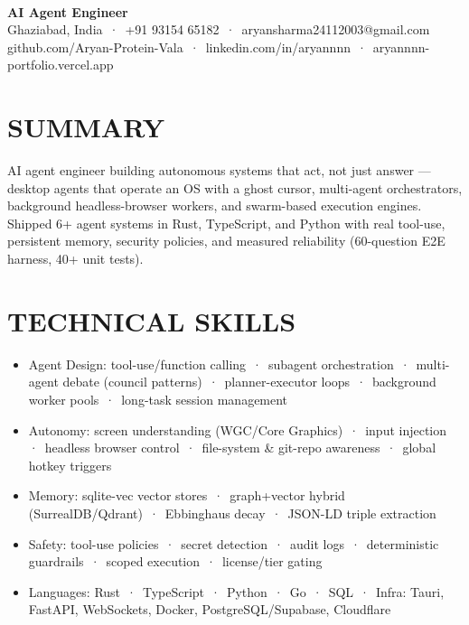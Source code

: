\documentclass[9pt]{article}
\begin{document}
\\[3pt]
{\large\bfseries AI Agent Engineer}\\[3pt]
{\small\color{greyc} Ghaziabad, India \,·\, +91 93154 65182 \,·\, aryansharma24112003@gmail.com}\vspace{-2pt}
{\small\color{greyc} github.com/Aryan-Protein-Vala \,·\, linkedin.com/in/aryannnn \,·\, aryannnn-portfolio.vercel.app}\vspace{-2pt}
\section*{SUMMARY}
AI agent engineer building autonomous systems that act, not just answer  ---  desktop agents that operate an OS with a ghost cursor, multi-agent orchestrators, background headless-browser workers, and swarm-based execution engines. Shipped 6+ agent systems in Rust, TypeScript, and Python with real tool-use, persistent memory, security policies, and measured reliability (60-question E2E harness, 40+ unit tests).
\vspace{1pt}
\section*{TECHNICAL SKILLS}
\begin{itemize}[leftmargin=11pt,itemsep=0pt,topsep=1pt,parsep=0pt]
\item Agent Design: tool-use/function calling \,·\, subagent orchestration \,·\, multi-agent debate (council patterns) \,·\, planner-executor loops \,·\, background worker pools \,·\, long-task session management
\item Autonomy: screen understanding (WGC/Core Graphics) \,·\, input injection \,·\, headless browser control \,·\, file-system \& git-repo awareness \,·\, global hotkey triggers
\item Memory: sqlite-vec vector stores \,·\, graph+vector hybrid (SurrealDB/Qdrant) \,·\, Ebbinghaus decay \,·\, JSON-LD triple extraction
\item Safety: tool-use policies \,·\, secret detection \,·\, audit logs \,·\, deterministic guardrails \,·\, scoped execution \,·\, license/tier gating
\item Languages: Rust \,·\, TypeScript \,·\, Python \,·\, Go \,·\, SQL \,·\, Infra: Tauri, FastAPI, WebSockets, Docker, PostgreSQL/Supabase, Cloudflare
\end{itemize}
\end{document}
